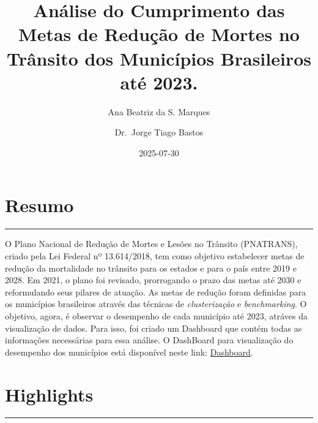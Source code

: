 \documentclass[
  letterpaper,
  DIV=11,
  numbers=noendperiod]{scrreprt}
\title{Análise do Cumprimento das Metas de Redução de Mortes no Trânsito
dos Municípios Brasileiros até 2023.}
\author{Ana Beatriz da S. Marques \and Dr.~Jorge Tiago Bastos}
\date{2025-07-30}
\renewcommand*\contentsname{Table of contents}
\newcommand\contentsname{Table of contents}
\begin{document}
\maketitle

\renewcommand*\contentsname{Table of contents}
{
\hypersetup{linkcolor=}
\setcounter{tocdepth}{2}
\tableofcontents
}


\chapter*{Resumo}\label{resumo}


\begin{center}\rule{0.5\linewidth}{0.5pt}\end{center}

O Plano Nacional de Redução de Mortes e Lesões no Trânsito (PNATRANS),
criado pela Lei Federal nº 13.614/2018, tem como objetivo estabelecer
metas de redução da mortalidade no trânsito para os estados e para o
país entre 2019 e 2028. Em 2021, o plano foi revisado, prorrogando o
prazo das metas até 2030 e reformulando seus pilares de atuação. As
metas de redução foram definidas para os municípios brasileiros através
das técnicas de \emph{clusterização} e \emph{benchmarking}. O objetivo,
agora, é observar o desempenho de cada município até 2023, atráves da
visualização de dados. Para isso, foi criado um Dashboard que contém
todas as informações necessárias para essa análise. O DashBoard para
visualização do desempenho dos municípios está disponível neste link:
\href{https://beatrizmarques.shinyapps.io/cumprimento_metas/}{Dashboard}.


\chapter*{Highlights}\label{highlights}


\begin{center}\rule{0.5\linewidth}{0.5pt}\end{center}
\end{document}
